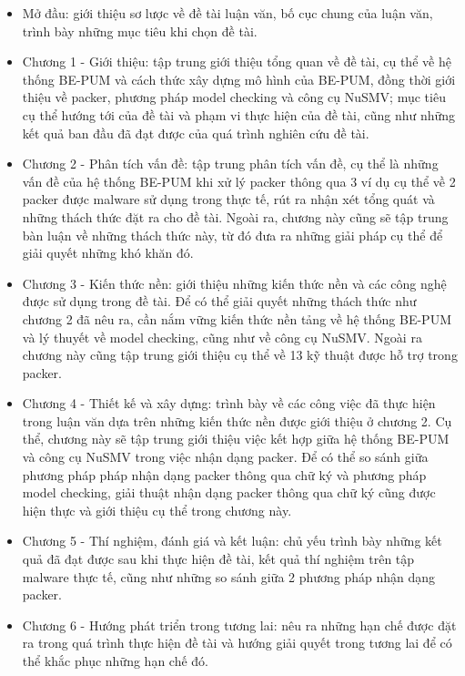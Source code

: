 \begin{itemize}
\item{Mở đầu: giới thiệu sơ lược về đề tài luận văn, bố cục chung của luận văn, trình bày những mục tiêu khi chọn đề tài.\\}
\item{Chương 1 - Giới thiệu: tập trung giới thiệu tổng quan về đề tài, cụ thể về hệ thống BE-PUM và cách thức xây dựng mô hình của BE-PUM, đồng thời giới thiệu về packer, phương pháp model checking và công cụ NuSMV; mục tiêu cụ thể hướng tới của đề tài và phạm vi thực hiện của đề tài, cũng như những kết quả ban đầu đã đạt được của quá trình nghiên cứu đề tài.\\}
\item{Chương 2 - Phân tích vấn đề: tập trung phân tích vấn đề, cụ thể là những vấn đề của hệ thống BE-PUM khi xử lý packer thông qua 3 ví dụ cụ thể về 2 packer được malware sử dụng trong thực tế, rút ra nhận xét tổng quát và những thách thức đặt ra cho đề tài. Ngoài ra, chương này cũng sẽ tập trung bàn luận về những thách thức này, từ đó đưa ra những giải pháp cụ thể để giải quyết những khó khăn đó.\\}
\item{Chương 3 - Kiến thức nền: giới thiệu những kiến thức nền và các công nghệ được sử dụng trong đề tài. Để có thể giải quyết những thách thức như chương 2 đã nêu ra, cần nắm vững kiến thức nền tảng về hệ thống BE-PUM và lý thuyết về model checking, cũng như về công cụ NuSMV. Ngoài ra chương này cũng tập trung giới thiệu cụ thể về 13 kỹ thuật được hỗ trợ trong packer.\\}
\item{Chương 4 - Thiết kế và xây dựng: trình bày về các công việc đã thực hiện trong luận văn dựa trên những kiến thức nền được giới thiệu ở chương 2. Cụ thể, chương này sẽ tập trung giới thiệu việc kết hợp giữa hệ thống BE-PUM và công cụ NuSMV trong việc nhận dạng packer. Để có thể so sánh giữa phương pháp pháp nhận dạng packer thông qua chữ ký và phương pháp model checking, giải thuật nhận dạng packer thông qua chữ ký cũng được hiện thực và giới thiệu cụ thể trong chương này.\\}
\item{Chương 5 - Thí nghiệm, đánh giá và kết luận: chủ yếu trình bày những kết quả đã đạt được sau khi thực hiện đề tài, kết quả thí nghiệm trên tập malware thực tế, cũng như những so sánh giữa 2 phương pháp nhận dạng packer.\\}
\item{Chương 6 - Hướng phát triển trong tương lai: nêu ra những hạn chế được đặt ra trong quá trình thực hiện đề tài và hướng giải quyết trong tương lai để có thể khắc phục những hạn chế đó.}
\end{itemize}

